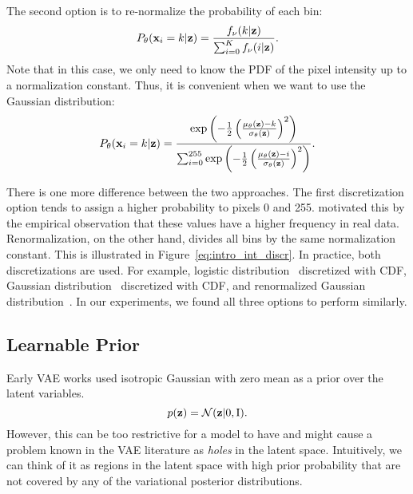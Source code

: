 The second option is to re-normalize the probability of each bin:
\begin{equation}\label{eq:intro_softmax_discr}
\begin{aligned}
    P_{\theta}(\rvx_i = k|\rvz) = \frac{f_{\nu}(k|\rvz)}{\sum_{i=0}^K f_{\nu}(i|\rvz)}.
\end{aligned}
\end{equation}
Note that in this case, we only need to know the PDF of the pixel intensity up to a normalization constant. Thus, it is convenient when we want to use the Gaussian distribution:
\begin{equation}
\begin{aligned}
    P_{\theta}({\mathbf{x}}_i = k|{\mathbf{z}}) = \frac{\exp\left(-\frac12 \left(\frac{\mu_{\theta}({\mathbf{z}}) - k}{\sigma_{\theta}({\mathbf{z}})}\right)^2\right)}{\sum_{i=0}^{255} \exp\left(-\frac12 \left(\frac{\mu_{\theta}({\mathbf{z}}) - i}{\sigma_{\theta}({\mathbf{z}})}\right)^2\right)}.
\end{aligned}
\end{equation}

There is one more difference between the two approaches. The first discretization option tends to assign a higher probability to pixels 0 and 255. \citet{salimans2016improved} motivated this by the empirical observation that these values have a higher frequency in real data. Renormalization, on the other hand, divides all bins by the same normalization constant. This is illustrated in Figure~\ref{eq:intro_int_discr}.
In practice, both discretizations are used. 
For example, logistic distribution~\citep{vahdat2020nvae, Child2020-ze} discretized with CDF, Gaussian distribution~\citep{ho2020denoising} discretized with CDF, and renormalized Gaussian distribution~\citep{kingma2021variational}. 
In our experiments, we found all three options to perform similarly. 


\subsection{Learnable Prior}
Early VAE works used isotropic Gaussian with zero mean as a prior over the latent variables.
\begin{equation}
    p({\mathbf{z}}) = \mathcal{N}({\mathbf{z}} | 0, \text{I}).
\end{equation}
However, this can be too restrictive for a model to have and might cause a problem known in the VAE literature as \textit{holes} in the latent space. Intuitively, we can think of it as regions in the latent space with high prior probability that are not covered by any of the variational posterior distributions. 


